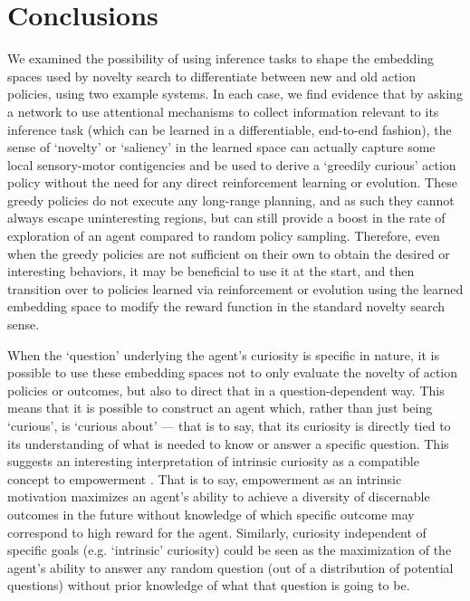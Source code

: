 \documentclass[letterpaper]{article}
\begin{document}
\section{Conclusions}

We examined the possibility of using inference tasks to shape the embedding spaces used by novelty search to differentiate between new and old action policies, using two example systems. In each case, we find evidence that by asking a network to use attentional mechanisms to collect information relevant to its inference task (which can be learned in a differentiable, end-to-end fashion), the sense of `novelty' or `saliency' in the learned space can actually capture some local sensory-motor contigencies and be used to derive a `greedily curious' action policy without the need for any direct reinforcement learning or evolution. These greedy policies do not execute any long-range planning, and as such they cannot always escape uninteresting regions, but can still provide a boost in the rate of exploration of an agent compared to random policy sampling. Therefore, even when the greedy policies are not sufficient on their own to obtain the desired or interesting behaviors, it may be beneficial to use it at the start, and then transition over to policies learned via reinforcement or evolution using the learned embedding space to modify the reward function in the standard novelty search sense.

When the `question' underlying the agent's curiosity is specific in nature, it is possible to use these embedding spaces not to only evaluate the novelty of action policies or outcomes, but also to direct that in a question-dependent way. This means that it is possible to construct an agent which, rather than just being `curious', is `curious about' --- that is to say, that its curiosity is directly tied to its understanding of what is needed to know or answer a specific question. This suggests an interesting interpretation of intrinsic curiosity as a compatible concept to empowerment \citep{klyubin2005empowerment, klyubin2005all}. That is to say, empowerment as an intrinsic motivation maximizes an agent's ability to achieve a diversity of discernable outcomes in the future without knowledge of which specific outcome may correspond to high reward for the agent. Similarly, curiosity independent of specific goals (e.g. `intrinsic' curiosity) could be seen as the maximization of the agent's ability to answer any random question (out of a distribution of potential questions) without prior knowledge of what that question is going to be.

\footnotesize



\end{document}
